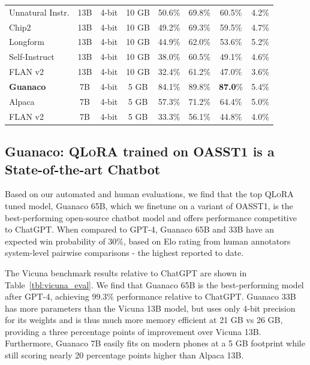 \documentclass{article}
\newcommand{\method}{\textsc{QLoRA}\xspace}
\newcommand{\bfmodel}{\textbf{Guanaco}\xspace}
\newcommand{\model}{{Guanaco}\xspace}
\begin{document}
\begin{table}[]
{\begin{tabular}{lccccccc}
Unnatural Instr. & 13B & 4-bit & 10 GB & 50.6\% & 69.8\% & 60.5\% & 4.2\% \\
Chip2 & 13B & 4-bit & 10 GB & 49.2\% & 69.3\% & 59.5\% & 4.7\% \\
Longform & 13B & 4-bit & 10 GB & 44.9\% & 62.0\% & 53.6\% & 5.2\% \\
Self-Instruct & 13B & 4-bit & 10 GB & 38.0\% & 60.5\% & 49.1\% & 4.6\% \\
FLAN v2 & 13B & 4-bit & 10 GB & 32.4\% & 61.2\% & 47.0\% & 3.6\% \\\midrule
\bfmodel & 7B & 4-bit & 5 GB & 84.1\% & 89.8\% & \textbf{87.0}\% & 5.4\% \\
Alpaca & 7B & 4-bit & 5 GB & 57.3\% & 71.2\% & 64.4\% & 5.0\% \\
FLAN v2 & 7B & 4-bit & 5 GB & 33.3\% & 56.1\% & 44.8\% & 4.0\% \\\bottomrule
\end{tabular}}
\end{table}


\subsection{\bfmodel: \method trained on OASST1 is a State-of-the-art Chatbot} 
Based on our automated and human evaluations, we find that the top \method tuned model, \model 65B, which we finetune on a variant of OASST1, is the best-performing open-source chatbot model and offers performance competitive to ChatGPT. When compared to GPT-4, \model 65B and 33B have an expected win probability of 30\%, based on Elo rating from human annotators system-level pairwise comparisons - the highest reported to date.

The Vicuna benchmark \cite{vicuna2023} results relative to ChatGPT are shown in Table~\ref{tbl:vicuna_eval}. We find that \model 65B is the best-performing model after GPT-4, achieving 99.3\% performance relative to ChatGPT. \model 33B has more parameters than the Vicuna 13B model, but uses only 4-bit precision for its weights and is thus much more memory efficient at 21 GB vs 26 GB, providing a three percentage points of improvement over Vicuna 13B. Furthermore, \model 7B easily fits on modern phones at a 5 GB footprint while still scoring nearly 20 percentage points higher than Alpaca 13B. 
\end{document}
